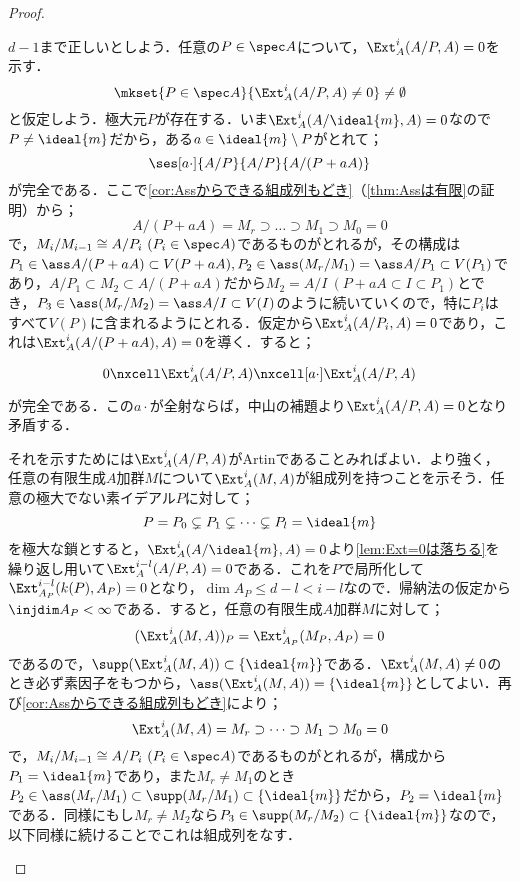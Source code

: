 \begin{proof}
\begin{eqv}[7]
		$d-1$まで正しいとしよう．任意の$P\in\spec A$について，$\Ext^i_A(A/P,A)=0$を示す．
		\[\mkset{P\in\spec A}{\Ext^i_A(A/P,A)\neq0}\neq\emptyset\]
		と仮定しよう．極大元$P$が存在する．いま$\Ext^i_A(A/\ideal{m},A)=0$なので$P\neq\ideal{m}$だから，ある$a\in\ideal{m}\setminus P$がとれて；
		\[\ses[a\cdot]{A/P}{A/P}{A/(P+aA)}\]
		が完全である．ここで\ref{cor:Assからできる組成列もどき}（\ref{thm:Assは有限}の証明）から；
		\[A/(P+aA)=M_r\supset\dots\supset M_1\supset M_0=0\]
		で，$M_{i}/M_{i-1}\cong A/P_i~(P_i\in\spec A)$であるものがとれるが，その構成は$P_1\in\ass A/(P+aA)\subset V(P+aA), P_2\in\ass (M_r/M_1)=\ass A/P_1\subset V(P_1)$であり，$A/P_1\subset M_2\subset A/(P+aA)$だから$M_2=A/I~(P+aA\subset I\subset P_1)$とでき，$P_3\in\ass (M_r/M_2)=\ass A/I\subset V(I)$のように続いていくので，特に$P_i$はすべて$V(P)$に含まれるようにとれる．仮定から$\Ext_A^i(A/P_i,A)=0$であり，これは$\Ext_A^i(A/(P+aA),A)=0$を導く．すると；
		\[\begin{tikzcd}
		0\nxcell\Ext^i_A(A/P,A)\nxcell[a\cdot]\Ext^i_A(A/P,A)
		\end{tikzcd}\]
		が完全である．この$a\cdot$が全射ならば，中山の補題より$\Ext^i_A(A/P,A)=0$となり矛盾する．
		
		それを示すためには$\Ext^i_A(A/P,A)$がArtinであることみればよい．より強く，任意の有限生成$A$加群$M$について$\Ext^i_A(M,A)$が組成列を持つことを示そう．任意の極大でない素イデアル$P$に対して；
		\[P=P_0\subsetneq P_1\subsetneq\dots\subsetneq P_l=\ideal{m}\]
		を極大な鎖とすると，$\Ext^i_A(A/\ideal{m},A)=0$より\ref{lem:Ext=0は落ちる}を繰り返し用いて$\Ext^{i-l}_A(A/P,A)=0$である．これを$P$で局所化して$\Ext^{i-l}_{A_P}(k(P),A_P)=0$となり，$\dim A_P\leq d-l<i-l$なので．帰納法の仮定から$\injdim A_P<\infty$である．すると，任意の有限生成$A$加群$M$に対して；
		\[(\Ext^i_A(M,A))_P=\Ext^i_{A_P}(M_P,A_P)=0\]
		であるので，$\supp(\Ext^i_A(M,A))\subset\{\ideal{m}\}$である．$\Ext^i_A(M,A)\neq0$のとき必ず素因子をもつから，$\ass(\Ext^i_A(M,A))=\{\ideal{m}\}$としてよい．再び\ref{cor:Assからできる組成列もどき}により；
		\[\Ext^i_A(M,A)=M_r\supset\dots\supset M_1\supset M_0=0\]
		で，$M_{i}/M_{i-1}\cong A/P_i~(P_i\in\spec A)$であるものがとれるが，構成から$P_1=\ideal{m}$であり，また$M_r\neq M_1$のとき$P_2\in\ass (M_r/M_1)\subset \supp (M_r/M_1)\subset\{\ideal{m}\}$だから，$P_2=\ideal{m}$である．同様にもし$M_r\neq M_2$なら$P_3\in\supp(M_r/M_2)\subset\{\ideal{m}\}$なので，以下同様に続けることでこれは組成列をなす．
	\end{eqv}
\end{proof}


